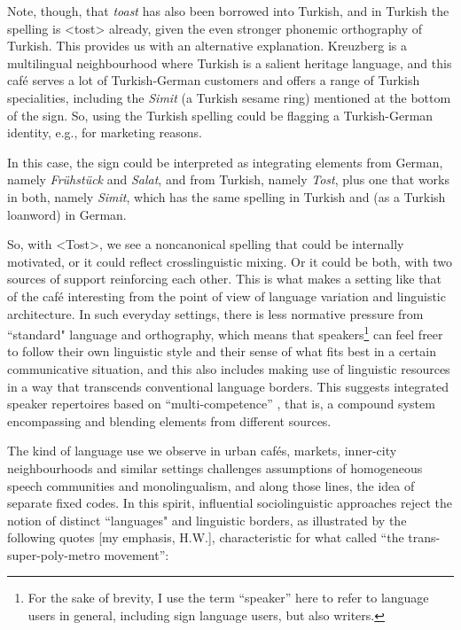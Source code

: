 Note, though, that \textit{toast} has also been borrowed into Turkish, and in Turkish the spelling is <tost> already, given the even stronger phonemic orthography of Turkish. This provides us with an alternative explanation. Kreuzberg is a multilingual neighbourhood where Turkish is a salient heritage language, and this café serves a lot of Turkish-German customers and offers a range of Turkish specialities, including the \textit{Simit} (a Turkish sesame ring) mentioned at the bottom of the sign. So, using the Turkish spelling could be flagging a Turkish-German identity, e.g., for marketing reasons.

In this case, the sign could be interpreted as integrating elements from German, namely \textit{Frühstück} and \textit{Salat}, and from Turkish, namely \textit{Tost}, plus one that works in both, namely \textit{Simit}, which has the same spelling in Turkish and (as a Turkish loanword) in German.

So, with <Tost>, we see a noncanonical spelling that could be internally motivated, or it could reflect crosslinguistic mixing. Or it could be both, with two sources of support reinforcing each other. This is what makes a setting like that of the café interesting from the point of view of language variation and linguistic architecture. In such everyday settings, there is less normative pressure from “standard" language and orthography, which means that speakers\footnote{For the sake of brevity, I use the term “speaker” here to refer to language users in general, including sign language users, but also writers.} can feel freer to follow their own linguistic style and their sense of what fits best in a certain communicative situation, and this also includes making use of linguistic resources in a way that transcends conventional language borders. This suggests integrated speaker repertoires based on “multi-competence” \citep{Cook2016}, that is, a compound system encompassing and blending elements from different sources.

The kind of language use we observe in urban cafés, markets, inner-city neighbourhoods and similar settings challenges assumptions of homogeneous speech communities and monolingualism, and along those lines, the idea of separate fixed codes. In this spirit, influential sociolinguistic approaches reject the notion of distinct “languages" and linguistic borders, as illustrated by the following quotes [my emphasis, H.W.], characteristic for what \citet{Pennycook2016} called “the trans-super-poly-metro movement”:

